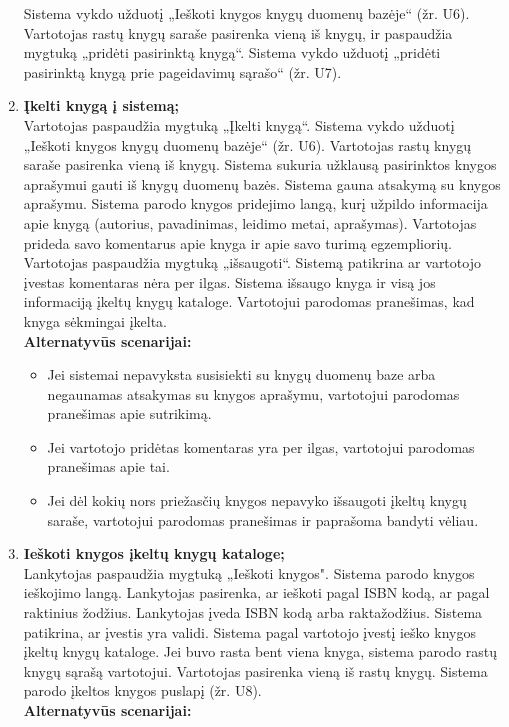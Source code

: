 \documentclass{VUMIFPSkursinis}
\begin{document}
\begin{enumerate}[label=\textbf{U\arabic*.}]
				Sistema vykdo užduotį „Ieškoti knygos knygų duomenų bazėje“ (žr. U6).
				Vartotojas rastų knygų saraše pasirenka vieną iš knygų, ir paspaudžia mygtuką „pridėti pasirinktą knygą“.
				Sistema vykdo užduotį „pridėti pasirinktą knygą prie pageidavimų sąrašo“ (žr. U7).
			\item \textbf{Įkelti knygą į sistemą;}\\
				Vartotojas paspaudžia mygtuką „Įkelti knygą“. Sistema vykdo užduotį „Ieškoti knygos knygų duomenų bazėje“ (žr. U6).
				Vartotojas rastų knygų saraše pasirenka vieną iš knygų. Sistema sukuria užklausą pasirinktos knygos aprašymui gauti iš knygų duomenų bazės. 
				Sistema gauna atsakymą su knygos aprašymu. Sistema parodo knygos pridejimo langą, 
				kurį užpildo informacija apie knygą (autorius, pavadinimas, leidimo metai, aprašymas). Vartotojas prideda savo komentarus apie knyga ir apie
				savo turimą egzempliorių. Vartotojas paspaudžia mygtuką „išsaugoti“. Sistemą patikrina ar vartotojo įvestas komentaras nėra per ilgas.
				Sistema išsaugo knyga ir visą jos informaciją įkeltų knygų kataloge. Vartotojui parodomas pranešimas, kad knyga sėkmingai įkelta.\\
				\textbf{Alternatyvūs scenarijai:}
				\begin{itemize}
					\item Jei sistemai nepavyksta susisiekti su knygų duomenų baze arba negaunamas atsakymas su knygos aprašymu, vartotojui parodomas pranešimas apie sutrikimą.
					\item Jei vartotojo pridėtas komentaras yra per ilgas, vartotojui parodomas pranešimas apie tai.
					\item Jei dėl kokių nors priežasčių knygos nepavyko išsaugoti įkeltų knygų saraše, vartotojui parodomas pranešimas ir paprašoma bandyti vėliau.
				\end{itemize}
			\item \textbf{Ieškoti knygos įkeltų knygų kataloge;}\\
				Lankytojas paspaudžia mygtuką „Ieškoti knygos". Sistema parodo knygos ieškojimo langą.
				Lankytojas pasirenka, ar ieškoti pagal ISBN kodą, ar pagal raktinius žodžius. 
				Lankytojas įveda ISBN kodą arba raktažodžius. Sistema patikrina, ar įvestis yra validi.
				Sistema pagal vartotojo įvestį ieško knygos įkeltų knygų kataloge. 
				Jei buvo rasta bent viena knyga, sistema parodo rastų knygų sąrašą vartotojui. Vartotojas pasirenka vieną iš rastų knygų.
				Sistema parodo įkeltos knygos puslapį (žr. U8).\\
				\textbf{Alternatyvūs scenarijai:}

\end{enumerate}
\end{document}
